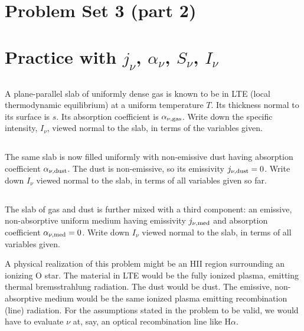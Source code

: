 \documentclass[11pt]{article}
\begin{document}
\section*{\centering Problem Set 3 (part 2)}

\section{Practice with $j_\nu$, $\alpha_\nu$, $S_\nu$, $I_\nu$}

\subsection{}

A plane-parallel slab of uniformly dense gas is known to be in LTE (local
thermodynamic equilibrium) at a uniform temperature $T$. Its thickness normal
to its surface is $s$. Its absorption coefficient is $\alpha_{\nu,{\rm gas}}$. 
Write down the
specific intensity, $I_\nu$, viewed normal to the slab, in terms of the variables
given.

\subsection{}

The same slab is now filled uniformly with non-emissive dust having absorption
coefficient $\alpha_{\nu,{\rm dust}}$. The dust is non-emissive, so its emissivity 
$j_{\nu,{\rm dust}}=0$.
Write down $I_\nu$ viewed normal to the slab, in terms of all variables given so
far.

\subsection{}

The slab of gas and dust is further mixed with a third component: an emissive,
non-absorptive uniform medium having emissivity $j_{\nu,{\rm med}}$ and
absorption coefficient $\alpha_{\nu,{\rm med}}=0$. Write down $I_\nu$ viewed
normal to the slab, in terms of all variables given.

A physical realization of this problem might be an HII region surrounding an
ionizing O star. The material in LTE would be the fully ionized plasma,
emitting thermal bremsstrahlung radiation. The dust would be dust. The
emissive, non-absorptive medium would be the same ionized plasma emitting
recombination (line) radiation. For the assumptions stated in the problem to be
valid, we would have to evaluate $\nu$ at, say, an optical recombination line
like H$\alpha$.
\end{document}
